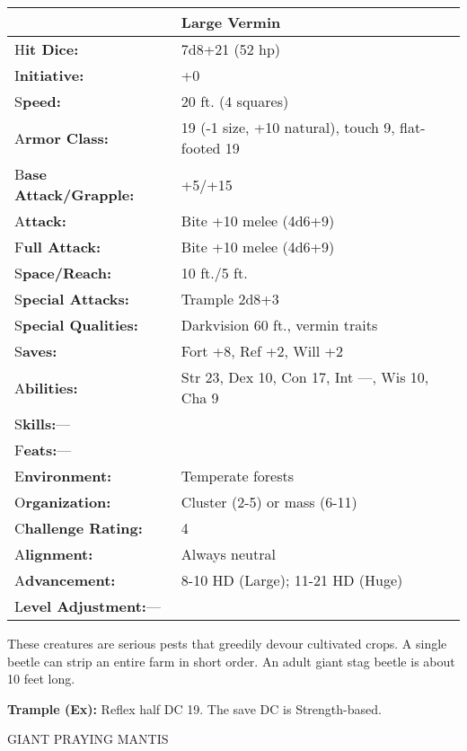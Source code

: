 \documentclass{article}
\begin{document}
\begin{tabular}{|>{\raggedright}p{91pt}|>{\raggedright}p{191pt}|}
\hline
  & Large Vermin\tabularnewline
\hline
H\textbf{it Dice:} & 7d8+21 (52 hp)\tabularnewline
\hline
I\textbf{nitiative:} & +0\tabularnewline
\hline
S\textbf{peed:} & 20 ft. (4 squares)\tabularnewline
\hline
A\textbf{rmor Class:} & 19 (-1 size, +10 natural), touch 9, flat-footed 19\tabularnewline
\hline
B\textbf{ase Attack/Grapple:} & +5/+15\tabularnewline
\hline
A\textbf{ttack:} & Bite +10 melee (4d6+9)\tabularnewline
\hline
F\textbf{ull Attack:} & Bite +10 melee (4d6+9)\tabularnewline
\hline
S\textbf{pace/Reach:} & 10 ft./5 ft.\tabularnewline
\hline
S\textbf{pecial Attacks:} & Trample 2d8+3\tabularnewline
\hline
S\textbf{pecial Qualities:} & Darkvision 60 ft., vermin traits\tabularnewline
\hline
S\textbf{aves:} & Fort +8, Ref +2, Will +2\tabularnewline
\hline
A\textbf{bilities:} & Str 23, Dex 10, Con 17, Int ---, Wis 10, Cha 9\tabularnewline
\hline
S\textbf{kills:}--- & \tabularnewline
\hline
F\textbf{eats:}--- & \tabularnewline
\hline
E\textbf{nvironment:} & Temperate forests\tabularnewline
\hline
O\textbf{rganization:} & Cluster (2-5) or mass (6-11)\tabularnewline
\hline
C\textbf{hallenge Rating:} & 4\tabularnewline
\hline
A\textbf{lignment:} & Always neutral\tabularnewline
\hline
A\textbf{dvancement:} & 8-10 HD (Large); 11-21 HD (Huge)\tabularnewline
\hline
L\textbf{evel Adjustment:}--- & \tabularnewline
\hline
\end{tabular}

These creatures are serious pests that greedily devour cultivated crops. A single 
beetle can strip an entire farm in short order. An adult giant stag beetle is about 
10 feet long.

\textbf{Trample (Ex): }Reflex half DC 19. The save DC is Strength-based.

\vspace{12pt}
GIANT PRAYING MANTIS
\end{document}
